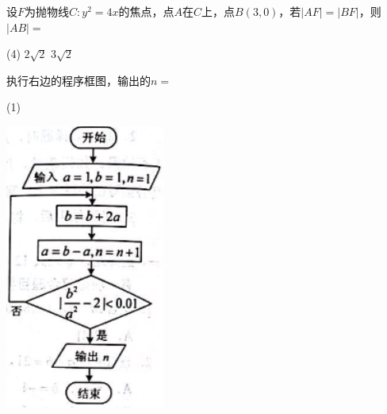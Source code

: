 \documentclass[12pt,space]{ctexart} %
\begin{document}
\begin{enumerate}[itemsep=0.2em,topsep=0pt]
  \item 设$F$为抛物线$C:y^{2}=4x$的焦点，点$A$在$C$上，点$B(3,0)$，若$|AF|=|BF|$，则$|AB|=$
  \begin{tasks}(4)
     \task $2\sqrt{2}$  \task $3\sqrt{2}$
  \end{tasks}

  \begin{minipage}[h][42ex][t]{.40\textwidth}
    \item 执行右边的程序框图，输出的$n=$
    \begin{tasks}(1)
    \end{tasks}
  \end{minipage}
  \begin{minipage}[h][42ex][t]{.55\textwidth}
    \flushright
    \includegraphics[width=.4\textwidth]{Image/ii-w-7.png}
  \end{minipage}



\end{enumerate}
\end{document}
